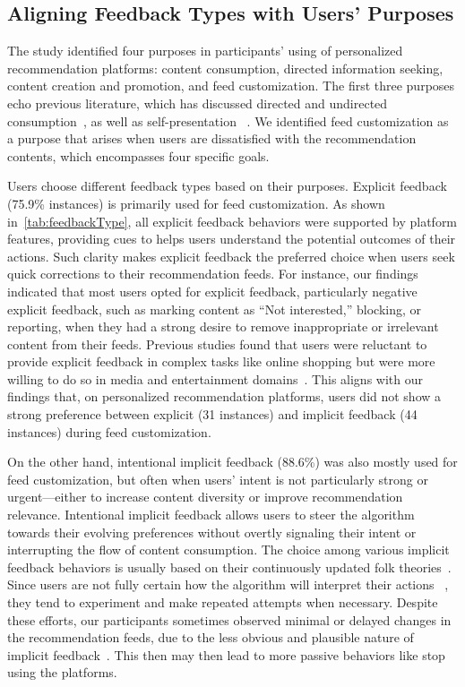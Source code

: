 \subsection{Aligning Feedback Types with Users' Purposes}
The study identified four purposes in participants' using of personalized recommendation platforms: content consumption, directed information seeking, content creation and promotion, and feed customization. The first three purposes echo previous literature, which has discussed directed and undirected consumption~\cite{feng2024mapping}, as well as self-presentation ~\cite{devito2017algorithms}. We identified feed customization as a purpose that arises when users are dissatisfied with the recommendation contents, which encompasses four specific goals. 

Users choose different feedback types based on their purposes. Explicit feedback (75.9\% instances) is primarily used for feed customization. As shown in~\autoref{tab:feedbackType}, all explicit feedback behaviors were supported by platform features, providing cues to helps users understand the potential outcomes of their actions. Such clarity makes explicit feedback the preferred choice when users seek quick corrections to their recommendation feeds. For instance, our findings indicated that most users opted for explicit feedback, particularly negative explicit feedback, such as marking content as ``Not interested,'' blocking, or reporting, when they had a strong desire to remove inappropriate or irrelevant content from their feeds. Previous studies found that users were reluctant to provide explicit feedback in complex tasks like online shopping but were more willing to do so in media and entertainment domains~\cite{white2005study,jawaheer2014modeling}.
This aligns with our findings that, on personalized recommendation platforms, users did not show a strong preference between explicit (31 instances) and implicit feedback (44 instances) during feed customization.

On the other hand, intentional implicit feedback (88.6\%) was also mostly used for feed customization, but often when users' intent is not particularly strong or urgent---either to increase content diversity or improve recommendation relevance. Intentional implicit feedback allows users to steer the algorithm towards their evolving preferences without overtly signaling their intent or interrupting the flow of content consumption. The choice among various implicit feedback behaviors is usually based on their continuously updated folk theories~\cite{devito2017algorithms}. Since users are not fully certain how the algorithm will interpret their actions ~\cite{eslami2015always}, they tend to experiment and make repeated attempts when necessary. Despite these efforts, our participants sometimes observed minimal or delayed changes in the recommendation feeds, due to the less obvious and plausible nature of implicit feedback~\cite{jannach2018recommending}. This then may then lead to more passive behaviors like stop using the platforms.

